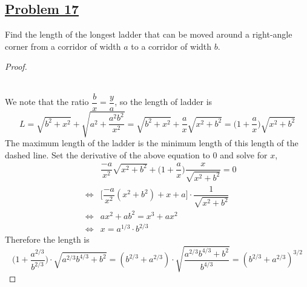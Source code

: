 \documentclass[10pt,letterpaper]{article}
\begin{document}
	\subsection*{{\color{purple}\underline{Problem 17}}}
	Find the length of the longest ladder that can be moved around a right-angle 
	corner from a corridor of width $a$ to a corridor of width $b$.
	\begin{proof} 
	\text{ } \\
	
	\text{ } \\
	We note that the ratio $\dfrac{b}{x} = \dfrac{y}{a}$, so the length of ladder
	is 
$$L = \sqrt{b^2 + x^2} + \sqrt{a^2 + \dfrac{a^2b^2}{x^2}}
= \sqrt{b^2 + x^2} + \dfrac{a}{x} \sqrt{x^2 + b^2} = \bigg(1 + \dfrac{a}{x}\bigg)\sqrt{x^2 + b^2}$$
The maximum length of the ladder is the minimum length of this length of the dashed line. 
Set the derivative of the above equation to $0$ and solve for $x$,
\begin{eqnarray*}
& & \dfrac{-a}{x^2} \sqrt{x^2 + b^2} + \bigg(1 + \dfrac{a}{x}\bigg)\dfrac{x}{\sqrt{x^2 + b^2}} = 0 \\
& \Leftrightarrow & \bigg[\dfrac{-a}{x^2}(x^2 + b^2) + x + a\bigg] \cdot \dfrac{1}{\sqrt{x^2 + b^2}} \\
& \Leftrightarrow & ax^2 + ab^2 = x^3 + ax^2 \\
& \Leftrightarrow & x = a^{1/3} \cdot b^{2/3} 
\end{eqnarray*}
Therefore the length is
$$\bigg(1 + \dfrac{a^{2/3}}{b^{2/3}}\bigg) \cdot \sqrt{a^{2/3}b^{4/3} + b^2}
= (b^{2/3} + a^{2/3}) \cdot \sqrt{\dfrac{a^{2/3}b^{4/3} + b^2}{b^{4/3}}} = (b^{2/3} + a^{2/3})^{3/2}$$
	\end{proof}
	
\end{document}

